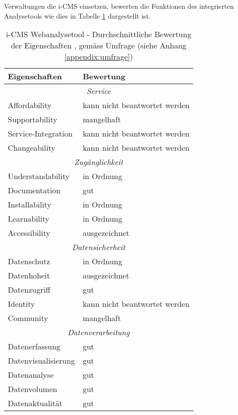 Verwaltungen die i-CMS einsetzen, bewerten die Funktionen des integrierten Analysetools wie dies in Tabelle \ref{tab: icmsfeaturebewertung} dargestellt ist. 

\begin{table}[h]
	\centering
	\begin{tabular}{ | p{4cm} | p{10cm} |}
		\hline
    \textbf{Eigenschaften} & \textbf{Bewertung}  \\
    \hline 
    \multicolumn{2}{|c|}{\textit{Service}}\\ \hline 
    Affordability  &  kann nicht beantwortet werden \\ \hline
    Supportability & mangelhaft \\ \hline
    Service-Integration & kann nicht beantwortet werden \\ \hline
    Changeability  & kann nicht beantwortet werden \\ \hline
    \multicolumn{2}{|c|}{\textit{Zugänglichkeit}}\\ \hline 
    Understandability   & in Ordnung \\ \hline
    Documentation  & gut \\ \hline
    Installability & in Ordnung \\ \hline
    Learnability  & in Ordnung \\ \hline
    Accessibility  & ausgezeichnet \\ \hline
    \multicolumn{2}{|c|}{\textit{Datensicherheit}}\\ \hline 
    Datenschutz  & in Ordnung \\ \hline
    Datenhoheit & ausgezeichnet \\ \hline
    Datenzugriff  & gut \\ \hline
    Identity  & kann nicht beantwortet werden \\  \hline
    Community  & mangelhaft \\ \hline
    \multicolumn{2}{|c|}{\textit{Datenverarbeitung}}\\ \hline 
    Datenerfassung  & gut \\  \hline
    Datenvisualisierung & gut \\ \hline
    Datenanalyse & gut \\ \hline
    Datenvolumen & gut \\ \hline
    Datenaktualität  & gut \\ \hline
	\end{tabular}
	\caption{i-CMS Webanalysetool - Durchschnittliche Bewertung der Eigenschaften \parencite{softwareProcurementEvaluationTable}, \parencite[S. 178]{nakatani2011toolselectionmethod} gemäss Umfrage (siehe Anhang \ref{appendix:umfrage})}
	\label{tab: icmsfeaturebewertung}
\end{table}

